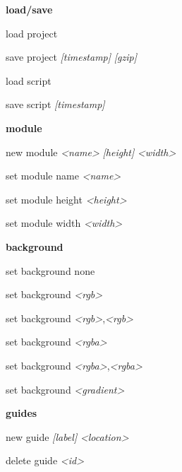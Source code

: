 \documentclass[a4paper,10pt,oneside]{article}
\begin{document}
\textbf{load/save}

load project

save project \textit{[timestamp]} \textit{[gzip]}
                                                  
load script

save script \textit{[timestamp]}

\textbf{module}

new module        \textit{<name>} \textit{[height]} \textit{<width>}

set module name   \textit{<name>}

set module height \textit{<height>}

set module width  \textit{<width>}


\textbf{background}

set background none

set background \textit{<rgb>}

set background \textit{<rgb>},\textit{<rgb>}

set background \textit{<rgba>}

set background \textit{<rgba>},\textit{<rgba>}

set background \textit{<gradient>}


\textbf{guides}

new guide \textit{[label]} \textir{[orientation]} \textit{<location>}

delete guide \textit{<id>}
\end{document}
